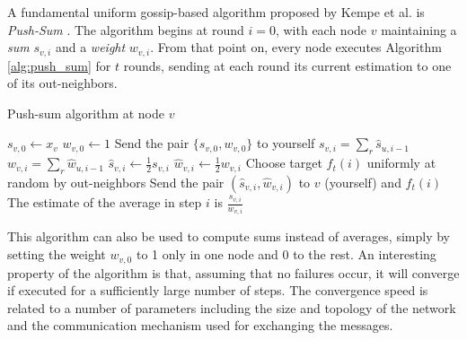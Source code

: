 \documentclass[a4paper,11pt,twoside]{report}
\begin{document}
A fundamental uniform gossip-based algorithm proposed by Kempe et al. is \textit{Push-Sum} \cite{Kempe:2004:SGR:1039488.1039491}. The algorithm begins at round $i=0$, with each node $v$ maintaining a \textit{sum} $s_{v,i}$ and a \textit{weight} $w_{v,i}$. From that point on, every node executes Algorithm \ref{alg:push_sum} for $t$ rounds, sending at each round its current estimation to one of its out-neighbors. \\
 
\begin{algorithm}
\caption{Push-sum algorithm at node $v$}
\label{alg:push_sum}
\begin{algorithmic}[1]

\STATE $s_{v,0} \leftarrow x_v$ 
\STATE $w_{v,0} \leftarrow 1$
\STATE Send the pair $\{s_{v,0}, w_{v,0}\}$ to yourself
\STATE $s_{v,i} = \sum_{r} \hat{s}_{u, i-1}$ 
\STATE $w_{v,i} = \sum_{r} \hat{w}_{u, i-1}$ 
\STATE $\hat{s}_{v,i} \leftarrow \frac{1}{2}s_{v,i}$
\STATE $\hat{w}_{v,i} \leftarrow \frac{1}{2}w_{v,i}$
\STATE Choose target $f_t(i)$ uniformly at random by out-neighbors
\STATE Send the pair $(\hat{s}_{v,i},\hat{w}_{v,i})$ to $v$ (yourself) and $f_t(i)$
\STATE The estimate of the average in step $i$ is $\frac{s_{v,i}}{w_{v,i}}$
\ENDFOR

\end{algorithmic}
\end{algorithm}

This algorithm can also be used to compute sums instead of averages, simply by setting the weight $w_{v,0}$ to 1 only in one node and 0 to the rest. An interesting property of the algorithm is that, assuming that no failures occur, it will converge if executed for a sufficiently large number of steps. The convergence speed is related to a number of parameters including the size and topology of the network and the communication mechanism used for exchanging the messages.  \\
\end{document}
